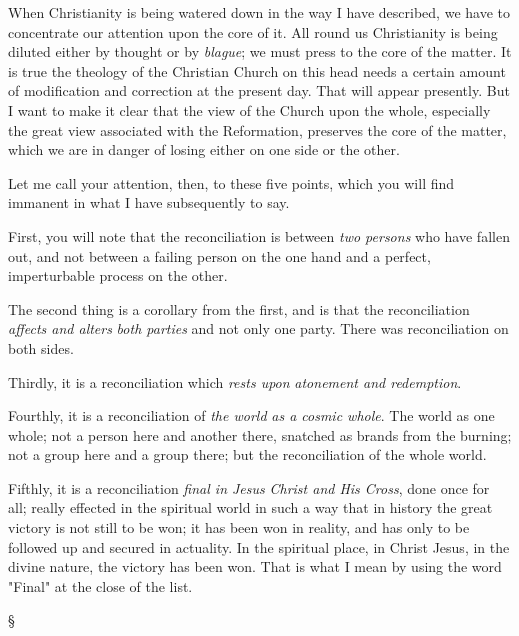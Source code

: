 \documentclass[12pt,a5paper,twoside,titlepage]{book}
\begin{document}
When Christianity is being watered down in 
the way I have described, we have to concentrate 
our attention upon the core of it. All 
round us Christianity is being diluted either 
by thought or by \textit{blague}; we must press to the 
core of the matter. It is true the theology of 
the Christian Church on this head needs a 
certain amount of modification and correction 
at the present day. That will appear presently. 
But I want to make it clear that the view of 
the Church upon the whole, especially the 
great view associated with the Reformation, 
preserves the core of the matter, which we 
are in danger of losing either on one side or 
the other. 

Let me call your attention, then, to these 
five points, which you will find immanent in 
what I have subsequently to say. 

First, you will note that the reconciliation is 
between \textit{two persons} who have fallen out, and 
not between a failing person on the one hand 
and a perfect, imperturbable process on the 
other. 

The second thing is a corollary from the first, 
and is that the reconciliation \textit{affects and alters} 
\textit{both parties} and not only one party. There 
was reconciliation on both sides. 

Thirdly, it is a reconciliation which \textit{rests upon} 
\textit{atonement and redemption}. 

Fourthly, it is a reconciliation of \textit{the world} 
\textit{as a cosmic whole}. The world as one whole; 
not a person here and another there, snatched 
as brands from the burning; not a group here 
and a group there; but the reconciliation of 
the whole world. 

Fifthly, it is a reconciliation \textit{final in Jesus} 
\textit{Christ and His Cross}, done once for all; really 
effected in the spiritual world in such a way 
that in history the great victory is not still to 
be won; it has been won in reality, and has 
only to be followed up and secured in actuality. 
In the spiritual place, in Christ Jesus, 
in the divine nature, the victory has been 
won. That is what I mean by using the 
word "Final" at the close of the list. 

\begin{center}
\S
\end{center}
\end{document}
